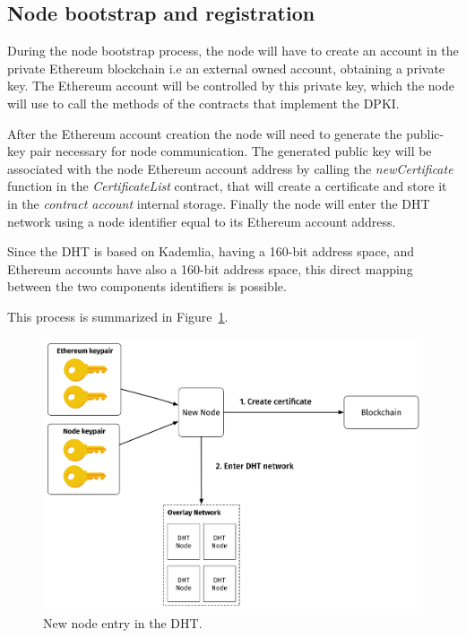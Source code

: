 {\subsection{Node bootstrap and registration}
During the node bootstrap process, the node will have to create an account in the private Ethereum blockchain i.e an external owned account, obtaining a private key.
The Ethereum account will be controlled by this private key, which the node will use to call the methods of the contracts that implement the DPKI.

After the Ethereum account creation the node will need to generate the public-key pair necessary for node communication.
The generated public key will be associated with the node Ethereum account address by calling the \textit{newCertificate} function in the \textit{CertificateList} contract, that will create a certificate and store it in the \textit{contract account} internal storage.
Finally the node will enter the DHT network using a node identifier equal to its Ethereum account address.

Since the DHT is based on Kademlia, having a 160-bit address space, and Ethereum accounts have also a 160-bit address space, this direct mapping between the two components identifiers is possible.

This process is summarized in Figure~\ref{fig:new-node}.

\begin{figure}
    \includegraphics[width=\linewidth]{Figures/new-node.png}
    \caption{New node entry in the DHT.}
    \label{fig:new-node}
\end{figure}

}
